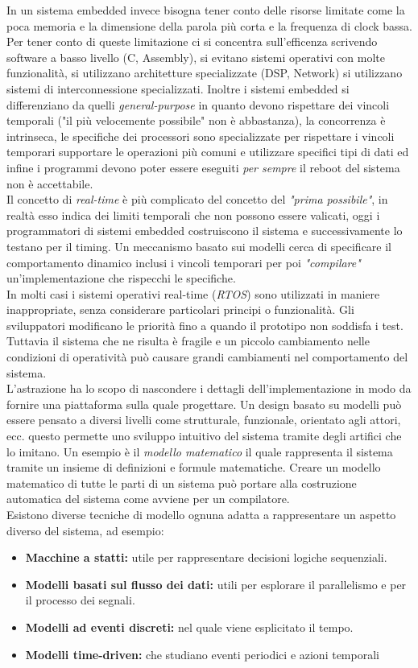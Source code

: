 In un sistema embedded invece bisogna tener conto delle risorse limitate come la poca memoria e la dimensione della parola più corta e la frequenza di clock bassa. Per tener conto di queste limitazione ci si concentra sull'efficenza scrivendo software a basso livello (C, Assembly), si evitano sistemi operativi con molte funzionalità, si utilizzano architetture specializzate (DSP, Network) si utilizzano sistemi di interconnessione specializzati. Inoltre i sistemi embedded si differenziano da quelli \emph{general-purpose} in quanto devono rispettare dei vincoli temporali ("il più velocemente possibile" non è abbastanza), la concorrenza è intrinseca, le specifiche dei processori sono specializzate per rispettare i vincoli temporari supportare le operazioni più comuni e utilizzare specifici tipi di dati ed infine i programmi devono poter essere eseguiti \emph{per sempre} il reboot del sistema non è accettabile.\\
Il concetto di \emph{real-time} è più complicato del concetto del \emph{"prima possibile"}, in realtà esso indica dei limiti temporali che non possono essere valicati, oggi i programmatori di sistemi embedded costruiscono il sistema e successivamente lo testano per il timing. Un meccanismo basato sui modelli cerca di specificare il comportamento dinamico inclusi i vincoli temporari per poi \emph{"compilare"} un'implementazione che rispecchi le specifiche.\\
In molti casi i sistemi operativi real-time (\emph{RTOS}) sono utilizzati in maniere inappropriate, senza considerare particolari principi o funzionalità. Gli sviluppatori modificano le priorità fino a quando il prototipo non soddisfa i test. Tuttavia il sistema che ne risulta è fragile e un piccolo cambiamento nelle condizioni di operatività può causare grandi cambiamenti nel comportamento del sistema.\\
L'astrazione ha lo scopo di nascondere i dettagli dell'implementazione in modo da fornire una piattaforma sulla quale progettare. Un design basato su modelli può essere pensato a diversi livelli come strutturale, funzionale, orientato agli attori, ecc. questo permette uno sviluppo intuitivo del sistema tramite degli artifici che lo imitano. Un esempio è il \emph{modello matematico} il quale rappresenta il sistema tramite un insieme di definizioni e formule matematiche. Creare un modello matematico di tutte le parti di un sistema può portare alla costruzione automatica del sistema come avviene per un compilatore.\\
Esistono diverse tecniche di modello ognuna adatta a rappresentare un aspetto diverso del sistema, ad esempio:
\begin{itemize}
\item \textbf{Macchine a statti:} utile per rappresentare decisioni logiche sequenziali.
\item \textbf{Modelli basati sul flusso dei dati:} utili per esplorare il parallelismo e per il processo dei segnali.
\item \textbf{Modelli ad eventi discreti:} nel quale viene esplicitato il tempo.
\item \textbf{Modelli time-driven:} che studiano eventi periodici e azioni temporali
\end{itemize}
